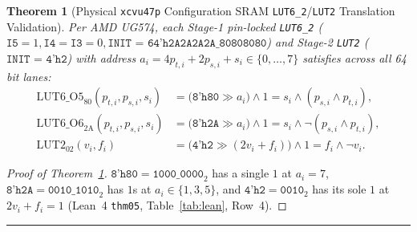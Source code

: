 \documentclass[10pt,twocolumn]{article}
\makeatletter
\newif\ifspecintwocol \specintwocolfalse
\newif\ifspecresume   \specresumefalse
\newcommand{\StartTwoCol}{%
  \if@twocolumn
    \let\spec@next\@empty
  \else
    \ifspecintwocol
      \let\spec@next\@empty
    \else
      \global\specintwocoltrue
      \def\spec@next{\begin{multicols}{2}}%
    \fi
  \fi
  \spec@next
}
\newcommand{\EndConnesPlate}{%
  \par\vspace{3pt}\noindent\textcolor{black!25}{\rule{\textwidth}{0.4pt}}\par\vspace{4pt}%
  \ifspecresume
    \global\specresumefalse
    \let\spec@platepost\StartTwoCol
  \else
    \let\spec@platepost\@empty
  \fi
  \spec@platepost
}
\theoremstyle{spectralthm}
\newtheorem{theorem}{Theorem}[section]
\makeatother
\begin{document}
\begin{theorem}[Physical \texttt{xcvu47p} Configuration SRAM \texttt{LUT6\_2}/\texttt{LUT2} Translation Validation]
\label{thm:lut_sram}
Per AMD UG574, each Stage-1 pin-locked \mbox{\texttt{LUT6\_2}} ($\texttt{I5} = 1, \texttt{I4} = \texttt{I3} = 0, \texttt{INIT = 64'h2A2A2A2A\_80808080}$) and Stage-2 \texttt{LUT2} ($\texttt{INIT = 4'h2}$) with address $a_i = 4p_{t,i} + 2p_{s,i} + s_i \in \{0,\ldots,7\}$ satisfies across all 64 bit lanes:
\begin{equation}
\label{eq:lut6_o5}
\begin{aligned}
\mathrm{LUT6\_O5}_{80}(p_{t,i}, p_{s,i}, s_i) &= \bigl(\texttt{8'h80} \gg a_i\bigr) \wedge 1 = s_i \wedge (p_{s,i} \wedge p_{t,i}),\\
\mathrm{LUT6\_O6}_{2\mathrm{A}}(p_{t,i}, p_{s,i}, s_i) &= \bigl(\texttt{8'h2A} \gg a_i\bigr) \wedge 1 = s_i \wedge \neg(p_{s,i} \wedge p_{t,i}),\\
\mathrm{LUT2}_{02}(v_i, f_i) &= \bigl(\texttt{4'h2} \gg (2v_i + f_i)\bigr) \wedge 1 = f_i \wedge \neg v_i.
\end{aligned}
\end{equation}
\end{theorem}
\begin{proof}[Proof of Theorem~\ref{thm:lut_sram}]
$\texttt{8'h80} = \texttt{1000\_0000}_2$ has a single $1$ at $a_i = 7$, $\texttt{8'h2A} = \texttt{0010\_1010}_2$ has $1$s at $a_i \in \{1, 3, 5\}$, and $\texttt{4'h2} = \texttt{0010}_2$ has its sole $1$ at $2v_i + f_i = 1$ (Lean~4 \texttt{thm05}, Table~\ref{tab:lean}, Row~4).
\end{proof}
\EndConnesPlate
\end{document}
